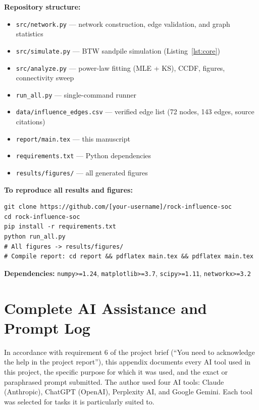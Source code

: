 \documentclass[12pt, a4paper]{article}
\begin{document}
\medskip
\noindent\textbf{Repository structure:}
\begin{itemize}[noitemsep]
  \item \texttt{src/network.py} --- network construction, edge
    validation, and graph statistics
  \item \texttt{src/simulate.py} --- BTW sandpile simulation
    (Listing~\ref{lst:core})
  \item \texttt{src/analyze.py} --- power-law fitting (MLE + KS),
    CCDF, figures, connectivity sweep
  \item \texttt{run\_all.py} --- single-command runner
  \item \texttt{data/influence\_edges.csv} --- verified edge list
    (72 nodes, 143 edges, source citations)
  \item \texttt{report/main.tex} --- this manuscript
  \item \texttt{requirements.txt} --- Python dependencies
  \item \texttt{results/figures/} --- all generated figures
\end{itemize}

\noindent\textbf{To reproduce all results and figures:}
\begin{lstlisting}[style=pythoncode, numbers=none]
git clone https://github.com/[your-username]/rock-influence-soc
cd rock-influence-soc
pip install -r requirements.txt
python run_all.py
# All figures -> results/figures/
# Compile report: cd report && pdflatex main.tex && pdflatex main.tex
\end{lstlisting}

\noindent\textbf{Dependencies:}
\texttt{numpy>=1.24},
\texttt{matplotlib>=3.7},
\texttt{scipy>=1.11},
\texttt{networkx>=3.2}


\section{Complete AI Assistance and Prompt Log}
\label{app:prompts}

In accordance with requirement 6 of the project brief
(``You need to acknowledge the help in the project report''),
this appendix documents every AI tool used in this project,
the specific purpose for which it was used, and the exact or
paraphrased prompt submitted.
The author used four AI tools: Claude (Anthropic),
ChatGPT (OpenAI), Perplexity AI, and Google Gemini.
Each tool was selected for tasks it is particularly suited to.
\end{document}
